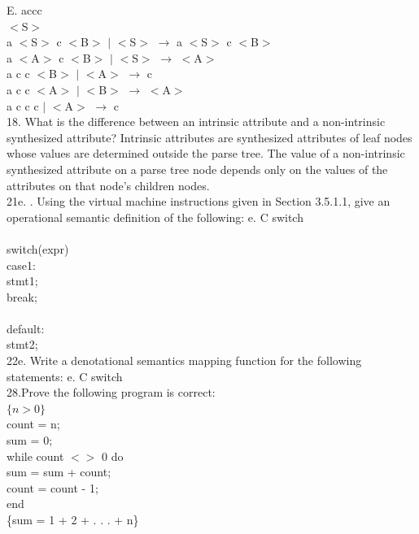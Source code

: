 \documentclass{article}
\begin{document}
E. accc\\
$<$S$>$\\
a $<$S$>$ c $<$B$>$ $|$ $<$S$>$ $\rightarrow$ a $<$S$>$ c $<$B$>$\\
a $<$A$>$ c $<$B$>$ $|$ $<$S$>$ $\rightarrow$ $<$A$>$\\
a c c $<$B$>$ $|$ $<$A$>$ $\rightarrow$ c\\
a c c $<$A$>$ $|$ $<$B$>$ $\rightarrow$ $<$A$>$\\
a c c c $|$ $<$A$>$ $\rightarrow$ c\\

18. What is the difference between an intrinsic attribute and a non-intrinsic
synthesized attribute? Intrinsic attributes are synthesized attributes of leaf nodes whose values are determined outside the parse tree. The value of a non-intrinsic synthesized attribute on a parse tree node depends only on the values of the attributes on that node's children nodes.\\

21e. . Using the virtual machine instructions given in Section 3.5.1.1, give an
operational semantic definition of the following: e. C switch
\\
\\switch(expr)\\
\indent case1:\\
\indent \indent stmt1;\\
\indent \indent break;\\
    \\
\indent default:\\
\indent \indent stmt2;\\

22e. Write a denotational semantics mapping function for the following
statements: e. C switch \\

28.Prove the following program is correct:\\
$\{n > 0\}$\\
count = n;\\
sum = 0;\\
while count $<>$ 0 do\\
sum = sum + count;\\
count = count - 1;\\
end\\
\{sum = 1 + 2 + . . . + n\}\\
\end{document}
